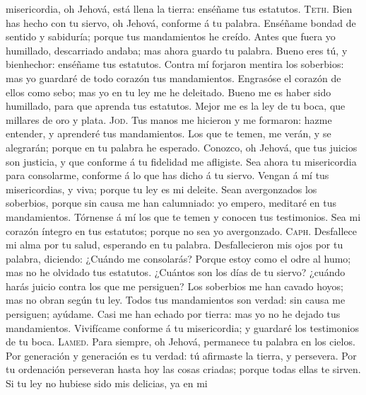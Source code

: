 misericordia, oh Jehová, está llena la tierra: enséñame tus estatutos.
 \textsc{Teth}. Bien has hecho con tu siervo, oh Jehová,
conforme á tu palabra.  Enséñame bondad de sentido y
sabiduría; porque tus mandamientos he creído.  Antes que
fuera yo humillado, descarriado andaba; mas ahora guardo tu palabra.
 Bueno eres tú, y bienhechor: enséñame tus estatutos.
 Contra mí forjaron mentira los soberbios: mas yo
guardaré de todo corazón tus mandamientos.  Engrasóse el
corazón de ellos como sebo; mas yo en tu ley me he deleitado.
 Bueno me es haber sido humillado, para que aprenda tus
estatutos.  Mejor me es la ley de tu boca, que millares
de oro y plata.  \textsc{Jod}. Tus manos me hicieron y me
formaron: hazme entender, y aprenderé tus mandamientos. 
Los que te temen, me verán, y se alegrarán; porque en tu palabra he
esperado.  Conozco, oh Jehová, que tus juicios son
justicia, y que conforme á tu fidelidad me afligiste. 
Sea ahora tu misericordia para consolarme, conforme á lo que has dicho á
tu siervo.  Vengan á mí tus misericordias, y viva; porque
tu ley es mi deleite.  Sean avergonzados los soberbios,
porque sin causa me han calumniado: yo empero, meditaré en tus
mandamientos.  Tórnense á mí los que te temen y conocen
tus testimonios.  Sea mi corazón íntegro en tus
estatutos; porque no sea yo avergonzado.  \textsc{Caph}.
Desfallece mi alma por tu salud, esperando en tu palabra.
 Desfallecieron mis ojos por tu palabra, diciendo:
¿Cuándo me consolarás?  Porque estoy como el odre al
humo; mas no he olvidado tus estatutos.  ¿Cuántos son los
días de tu siervo? ¿cuándo harás juicio contra los que me persiguen?
 Los soberbios me han cavado hoyos; mas no obran según tu
ley.  Todos tus mandamientos son verdad: sin causa me
persiguen; ayúdame.  Casi me han echado por tierra: mas
yo no he dejado tus mandamientos.  Vivifícame conforme á
tu misericordia; y guardaré los testimonios de tu boca. 
\textsc{Lamed}. Para siempre, oh Jehová, permanece tu palabra en los
cielos.  Por generación y generación es tu verdad: tú
afirmaste la tierra, y persevera.  Por tu ordenación
perseveran hasta hoy las cosas criadas; porque todas ellas te sirven.
 Si tu ley no hubiese sido mis delicias, ya en mi
